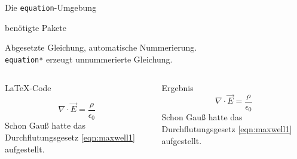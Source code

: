 \begin{frame}[fragile]{
  Die \texttt{equation}-Umgebung
  \hfill{}
}
  \begin{block}{benötigte Pakete}
    \begin{lstverbatim}
    \usepackage{amsmath}
    \usepackage{amssymb}
    \usepackage{mathtools}
    \end{lstverbatim}
  \end{block}
  Abgesetzte Gleichung, automatische Nummerierung. \\
  \texttt{equation*} erzeugt unnummerierte Gleichung.
  \begin{columns}[T]
    \begin{column}{0.6\textwidth}
      \begin{block}{\LaTeX-Code}
        \begin{lstverbatim}
        \begin{equation}
          \nabla \cdot \vec{E} =
          \frac{\rho} {\epsilon_0}
          \label{eqn:maxwell1}
        \end{equation}
        Schon Gauß hatte das Durchflutungsgesetz \eqref{eqn:maxwell1} aufgestellt.
        \end{lstverbatim}
      \end{block}
    \end{column}
    \begin{column}{0.35\textwidth}
      \begin{block}{Ergebnis}
        \begin{equation}
          \nabla \cdot \vec{E} =
          \frac{\rho}{\epsilon_0}
          \label{eqn:maxwell1}
        \end{equation}
        Schon Gauß hatte das Durchflutungsgesetz \eqref{eqn:maxwell1} aufgestellt.
      \end{block}
    \end{column}
  \end{columns}
\end{frame}

